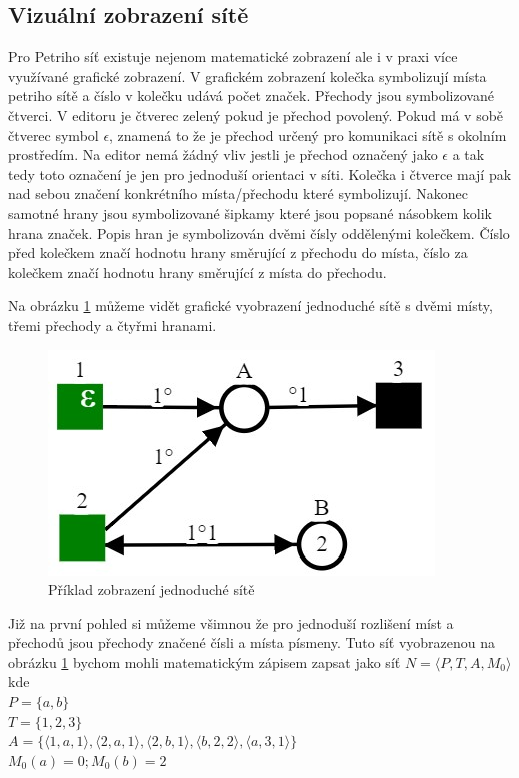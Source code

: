 \documentclass[
  biblatex,
  glossaries,
  index
]{kidiplom}
\begin{document}
\subsection{Vizuální zobrazení sítě}

Pro Petriho síť existuje nejenom matematické zobrazení ale i
v praxi více využívané grafické zobrazení. 
V grafickém zobrazení kolečka symbolizují místa petriho sítě
a číslo v kolečku udává počet značek. 
Přechody jsou symbolizované 
čtverci. V editoru je čtverec zelený pokud je přechod povolený.
Pokud má v sobě čtverec symbol $\epsilon$, znamená to že je 
přechod určený pro komunikaci sítě s okolním prostředím.
Na editor nemá žádný vliv jestli je přechod označený jako $\epsilon$
a tak tedy toto označení je jen pro jednoduší orientaci v síti.
Kolečka i čtverce mají pak nad sebou značení 
konkrétního místa/přechodu které symbolizují. 
Nakonec samotné hrany jsou symbolizované šipkamy které jsou 
popsané násobkem kolik hrana  značek.
Popis hran je symbolizován dvěmi čísly oddělenými kolečkem.
Číslo před kolečkem značí hodnotu hrany směrující z přechodu 
do místa, číslo za kolečkem značí hodnotu hrany směrující z 
místa do přechodu.

Na obrázku \ref{fig:jednoduchá síť zobrazení} můžeme vidět grafické 
vyobrazení jednoduché sítě s dvěmi místy, třemi přechody a čtyřmi hranami.
\begin{figure}[h]
  \centering
  \includegraphics[scale=0.8]{simple_net}
  \caption[síť]{Příklad zobrazení jednoduché sítě}\label{fig:jednoduchá síť zobrazení}
\end{figure}
Již na první pohled si můžeme všimnou že pro jednoduší rozlišení 
míst a přechodů jsou přechody značené čísli a místa písmeny.
Tuto síť vyobrazenou na obrázku \ref{fig:jednoduchá síť zobrazení} 
bychom mohli matematickým zápisem zapsat jako síť 
$ N = \langle P,T,A,M_{0}\rangle $
kde \\
$P = \{a,b\}$ \\
$T = \{1,2,3\}$ \\
$A = \{
  \langle 1,a,1 \rangle,
  \langle 2,a,1 \rangle,
  \langle 2,b,1 \rangle,
  \langle b,2,2 \rangle,
  \langle a,3,1 \rangle
\}$ \\
$M_{0}(a) = 0; M_{0}(b) = 2$
\end{document}
